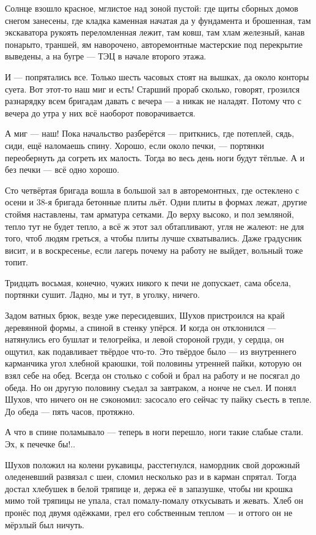 Солнце взошло красное, мглистое над зоной пустой: где щиты сборных домов снегом занесены, 
где кладка каменная начатая да у фундамента и брошенная, там экскаватора рукоять 
переломленная лежит, там ковш, там хлам железный, канав понарыто, траншей, ям наворочено, 
авторемонтные мастерские под перекрытие выведены, а на бугре --- ТЭЦ в начале второго этажа.

И --- попрятались все. Только шесть часовых стоят на вышках, да около конторы суета. Вот 
этот-то наш миг и есть! Старший прораб сколько, говорят, грозился разнарядку всем бригадам 
давать с вечера --- а никак не наладят. Потому что с вечера до утра у них всё наоборот 
поворачивается.

А миг --- наш! Пока начальство разберётся --- приткнись, где потеплей, сядь, сиди, ещё наломаешь 
спину. Хорошо, если около печки, --- портянки переобернуть да согреть их малость. Тогда во весь 
день ноги будут тёплые. А и без печки --- всё одно хорошо.

Сто четвёртая бригада вошла в большой зал в авторемонтных, где остеклено с осени и 38-я 
бригада бетонные плиты льёт. Одни плиты в формах лежат, другие стоймя наставлены, там 
арматура сетками. До верху высоко, и пол земляной, тепло тут не будет тепло, а всё ж этот зал 
обтапливают, угля не жалеют: не для того, чтоб людям греться, а чтобы плиты лучше 
схватывались. Даже градусник висит, и в воскресенье, если лагерь почему на работу не выйдет, 
вольный тоже топит.

Тридцать восьмая, конечно, чужих никого к печи не допускает, сама обсела, портянки сушит. 
Ладно, мы и тут, в уголку, ничего.

Задом ватных брюк, везде уже пересидевших, Шухов пристроился на край деревянной формы, а 
спиной в стенку упёрся. И когда он отклонился --- натянулись его бушлат и телогрейка, и левой 
стороной груди, у сердца, он ощутил, как подавливает твёрдое что-то. Это твёрдое было --- из 
внутреннего карманчика угол хлебной краюшки, той половины утренней пайки, которую он взял 
себе на обед. Всегда он столько с собой и брал на работу и не посягал до обеда. Но он другую 
половину съедал за завтраком, а нонче не съел. И понял Шухов, что ничего он не сэкономил: 
засосало его сейчас ту пайку съесть в тепле. До обеда --- пять часов, протяжно.

А что в спине поламывало --- теперь в ноги перешло, ноги такие слабые стали. Эх, к печечке бы!..

Шухов положил на колени рукавицы, расстегнулся, намордник свой дорожный оледеневший 
развязал с шеи, сломил несколько раз и в карман спрятал. Тогда достал хлебушек в белой 
тряпице и, держа её в запазушке, чтобы ни крошка мимо той тряпицы не упала, стал помалу-помалу 
откусывать и жевать. Хлеб он пронёс под двумя одёжками, грел его собственным теплом --- и 
оттого он не мёрзлый был ничуть.

